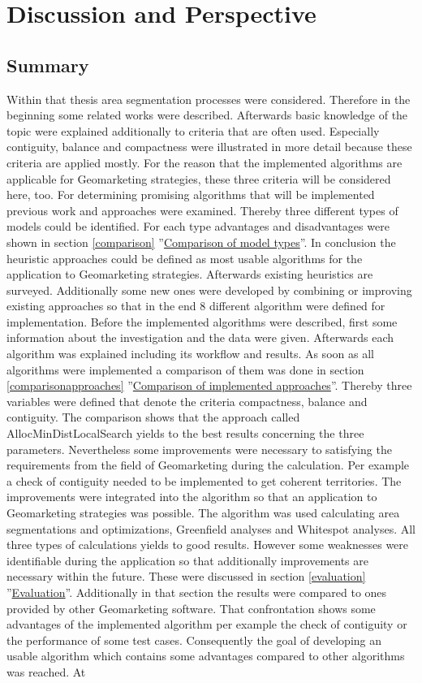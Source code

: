 \section{Discussion and Perspective}
\subsection{Summary}

Within that thesis area segmentation processes were considered. Therefore in the beginning some related works were described. Afterwards basic knowledge of the topic were explained additionally to criteria that are often used. Especially contiguity, balance and compactness were illustrated in more detail because these criteria are applied mostly. For the reason that the implemented algorithms are applicable for Geomarketing strategies, these three criteria will be considered here, too. For determining promising algorithms that will be implemented previous work and approaches were examined. Thereby three different types of models could be identified. For each type advantages and disadvantages were shown in section \ref{comparison} ''\hyperref[comparison]{Comparison of model types}''. In conclusion the heuristic approaches could be defined as most usable algorithms for the application to Geomarketing strategies. Afterwards existing heuristics are surveyed. Additionally some new ones were developed by combining or improving existing approaches so that in the end 8 different algorithm were defined for implementation. Before the implemented algorithms were described, first some information about the investigation and the data were given. Afterwards each algorithm was explained including its workflow and results. As soon as all algorithms were implemented a comparison of them was done in section \ref{comparisonapproaches} ''\hyperref[comparisonapproaches]{Comparison of implemented approaches}''. Thereby three variables were defined that denote the criteria compactness, balance and contiguity. The comparison shows that the approach called AllocMinDistLocalSearch yields to the best results concerning the three parameters. Nevertheless some improvements were necessary to satisfying the requirements from the field of Geomarketing during the calculation. Per example a check of contiguity needed to be implemented to get coherent territories. The improvements were integrated into the algorithm so that an application to Geomarketing strategies was possible. The algorithm was used calculating area segmentations and optimizations, Greenfield analyses and Whitespot analyses. All three types of calculations yields to good results. However some weaknesses were identifiable during the application so that additionally improvements are necessary within the future. These were discussed in section \ref{evaluation} ''\hyperref[evaluation]{Evaluation}''. Additionally in that section the results were compared to ones provided by other Geomarketing software. That confrontation shows some advantages of the implemented algorithm per example the check of contiguity or the performance of some test cases. Consequently the goal of developing an usable algorithm which contains some advantages compared to other algorithms was reached. At 